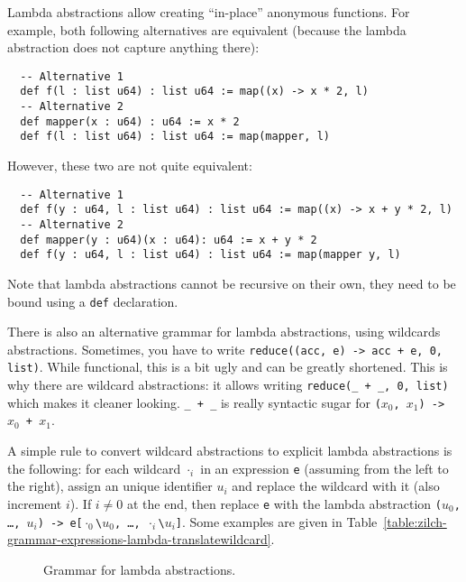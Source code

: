 Lambda abstractions allow creating ``in-place'' anonymous functions.
For example, both following alternatives are equivalent (because the lambda abstraction does not capture anything there):\\
\begin{verbatim}
  -- Alternative 1
  def f(l : list u64) : list u64 := map((x) -> x * 2, l)
  -- Alternative 2
  def mapper(x : u64) : u64 := x * 2
  def f(l : list u64) : list u64 := map(mapper, l)
\end{verbatim}
\vspace*{\baselineskip}

\noindent However, these two are not quite equivalent:\\
\begin{verbatim}
  -- Alternative 1
  def f(y : u64, l : list u64) : list u64 := map((x) -> x + y * 2, l)
  -- Alternative 2
  def mapper(y : u64)(x : u64): u64 := x + y * 2
  def f(y : u64, l : list u64) : list u64 := map(mapper y, l)
\end{verbatim}
\vspace*{\baselineskip}

\noindent Note that lambda abstractions cannot be recursive on their own, they need to be bound using a \texttt{def} declaration.

There is also an alternative grammar for lambda abstractions, using wildcards abstractions.
Sometimes, you have to write \verb|reduce((acc, e) -> acc + e, 0, list)|.
While functional, this is a bit ugly and can be greatly shortened.
This is why there are wildcard abstractions: it allows writing \verb|reduce(_ + _, 0, list)| which makes it cleaner looking.
\verb|_ + _| is really syntactic sugar for \texttt{($x_0$, $x_1$) -> $x_0$ + $x_1$}.

A simple rule to convert wildcard abstractions to explicit lambda abstractions is the following: for each wildcard $\cdot_i$ in an expression \verb|e| (assuming from the left to the right), assign an unique identifier $u_i$ and replace the wildcard with it (also increment $i$). If $i \neq 0$ at the end, then replace \verb|e| with the lambda abstraction \texttt{($u_0$, \ldots, $u_i$) -> e[$\cdot_0$\textbackslash$u_0$, \ldots, $\cdot_i$\textbackslash$u_i$]}.
Some examples are given in Table~\ref{table:zilch-grammar-expressions-lambda-translatewildcard}.

\begin{figure}[H]
  \centering


  \caption{Grammar for lambda abstractions.}
  \label{fig:zilch-gramma-expressions-lambda-grammar}
\end{figure}

